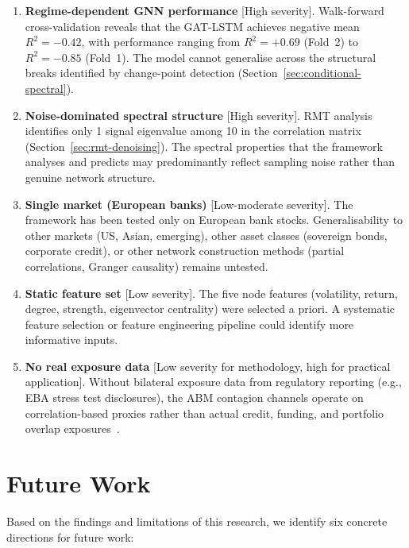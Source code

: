 \begin{enumerate}
    \item \textbf{Regime-dependent GNN performance} [High severity]. Walk-forward cross-validation reveals that the GAT-LSTM achieves negative mean $R^2 = -0.42$, with performance ranging from $R^2 = +0.69$ (Fold~2) to $R^2 = -0.85$ (Fold~1). The model cannot generalise across the structural breaks identified by change-point detection (Section~\ref{sec:conditional-spectral}).

    \item \textbf{Noise-dominated spectral structure} [High severity]. RMT analysis identifies only 1 signal eigenvalue among 10 in the correlation matrix (Section~\ref{sec:rmt-denoising}). The spectral properties that the framework analyses and predicts may predominantly reflect sampling noise rather than genuine network structure.

    \item \textbf{Single market (European banks)} [Low-moderate severity]. The framework has been tested only on European bank stocks. Generalisability to other markets (US, Asian, emerging), other asset classes (sovereign bonds, corporate credit), or other network construction methods (partial correlations, Granger causality) remains untested.

    \item \textbf{Static feature set} [Low severity]. The five node features (volatility, return, degree, strength, eigenvector centrality) were selected a priori. A systematic feature selection or feature engineering pipeline could identify more informative inputs.

    \item \textbf{No real exposure data} [Low severity for methodology, high for practical application]. Without bilateral exposure data from regulatory reporting (e.g., EBA stress test disclosures), the ABM contagion channels operate on correlation-based proxies rather than actual credit, funding, and portfolio overlap exposures~\cite{caccioli2015overlapping}.
\end{enumerate}


\section{Future Work}
\label{sec:future}

Based on the findings and limitations of this research, we identify six concrete directions for future work:

